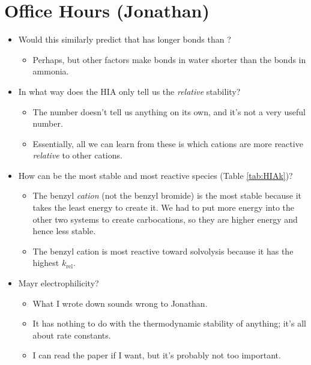 \documentclass[../notes.tex]{subfiles}
\begin{document}
\section{Office Hours (Jonathan)}
\begin{itemize}
    \item Would this similarly predict that  has longer bonds than ?
    \begin{itemize}
        \item Perhaps, but other factors make  bonds in water shorter than the  bonds in ammonia.
    \end{itemize}
    \item In what way does the HIA only tell us the \emph{relative} stability?
    \begin{itemize}
        \item The number doesn't tell us anything on its own, and it's not a very useful number.
        \item Essentially, all we can learn from these is which cations are more reactive \emph{relative} to other cations.
    \end{itemize}
    \item How can  be the most stable and most reactive species (Table \ref{tab:HIAk})?
    \begin{itemize}
        \item The benzyl \emph{cation} (not the benzyl bromide) is the most stable because it takes the least energy to create it. We had to put more energy into the other two systems to create carbocations, so they are higher energy and hence less stable.
        \item The benzyl cation is most reactive toward solvolysis because it has the highest $k_\text{rel}$.
    \end{itemize}
    \item Mayr electrophilicity?
    \begin{itemize}
        \item What I wrote down sounds wrong to Jonathan.
        \item It has nothing to do with the thermodynamic stability of anything; it's all about rate constants.
        \item I can read the paper if I want, but it's probably not too important.
    \end{itemize}
\end{itemize}
\end{document}
